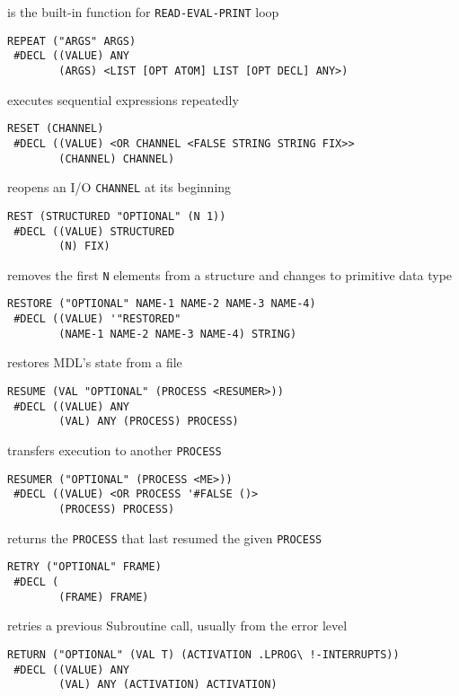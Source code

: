 \documentclass[a4paper]{scrbook}
\begin{document}
is the built-in function for \texttt{READ-EVAL-PRINT} loop

\begin{verbatim}
REPEAT ("ARGS" ARGS)
 #DECL ((VALUE) ANY
        (ARGS) <LIST [OPT ATOM] LIST [OPT DECL] ANY>)
\end{verbatim}

executes sequential expressions repeatedly

\begin{verbatim}
RESET (CHANNEL)
 #DECL ((VALUE) <OR CHANNEL <FALSE STRING STRING FIX>>
        (CHANNEL) CHANNEL)
\end{verbatim}

reopens an I/O \texttt{CHANNEL} at its beginning

\begin{verbatim}
REST (STRUCTURED "OPTIONAL" (N 1))
 #DECL ((VALUE) STRUCTURED
        (N) FIX)
\end{verbatim}

removes the first \texttt{N} elements from a structure and changes to primitive data type

\begin{verbatim}
RESTORE ("OPTIONAL" NAME-1 NAME-2 NAME-3 NAME-4)
 #DECL ((VALUE) '"RESTORED"
        (NAME-1 NAME-2 NAME-3 NAME-4) STRING)
\end{verbatim}

restores MDL's state from a file

\begin{verbatim}
RESUME (VAL "OPTIONAL" (PROCESS <RESUMER>))
 #DECL ((VALUE) ANY
        (VAL) ANY (PROCESS) PROCESS)
\end{verbatim}

transfers execution to another \texttt{PROCESS}

\begin{verbatim}
RESUMER ("OPTIONAL" (PROCESS <ME>))
 #DECL ((VALUE) <OR PROCESS '#FALSE ()>
        (PROCESS) PROCESS)
\end{verbatim}

returns the \texttt{PROCESS} that last resumed the given \texttt{PROCESS}

\begin{verbatim}
RETRY ("OPTIONAL" FRAME)
 #DECL (
        (FRAME) FRAME)
\end{verbatim}

retries a previous Subroutine call, usually from the error level

\begin{verbatim}
RETURN ("OPTIONAL" (VAL T) (ACTIVATION .LPROG\ !-INTERRUPTS))
 #DECL ((VALUE) ANY
        (VAL) ANY (ACTIVATION) ACTIVATION)
\end{verbatim}
\end{document}
